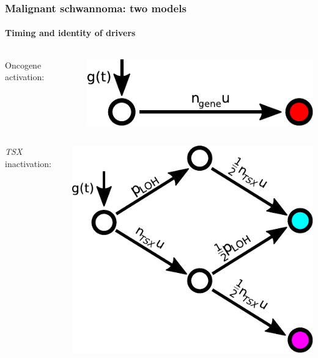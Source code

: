 \documentclass{beamer}
\begin{document}
\begin{frame}
    \frametitle{Malignant schwannoma: two models}
    \framesubtitle{Timing and identity of drivers}

    \begin{columns}
        \begin{column}{0.5\textwidth}
        Oncogene activation: %
        \end{column}
        \begin{column}{0.5\textwidth}
        \includegraphics[width=\textwidth]{figures/malignancy-oncogene.pdf}
        \end{column}
    \end{columns}

    \;

    \begin{columns}
        \begin{column}{0.5\textwidth}
        \emph{TSX} inactivation: %
        \end{column}
        \begin{column}{0.5\textwidth}
        \includegraphics[width=\textwidth]{figures/malignancy.pdf}
        \end{column}
    \end{columns}


\end{frame}
\end{document}
